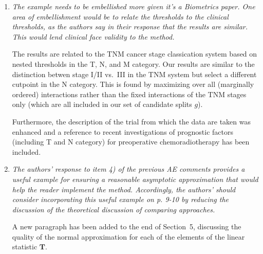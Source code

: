 \documentclass[11pt,a4paper]{article}
\begin{document}
\begin{enumerate}

  \item \textit{The example needs to be embellished more given it's a Biometrics paper. One area of
embellishment would be to relate the thresholds to the clinical thresholds, as the authors
say in their response that the results are similar. This would lend clinical face validity
to the method.}

The results are related to the TNM cancer stage classication system based on
nested thresholds in the T, N, and M category. Our results are similar to 
the distinction betwen stage I/II vs.\ III in the TNM system but select
a different cutpoint in the N category. This is found by maximizing over all
(marginally ordered) interactions rather than the fixed interactions of the
TNM stages only (which are all included in our set of candidate splits $g$).

Furthermore, the description of the trial from which the data are taken 
was enhanced and a reference to recent investigations of prognostic factors (including T and N category)
for preoperative chemoradiotherapy has been included.

\item \textit{The authors' response to item 4) of the previous AE comments provides a useful
example for ensuring a reasonable asymptotic approximation that would help the reader
implement the method. Accordingly, the authors' should consider incorporating this
useful example on p. 9-10 by reducing the discussion of the theoretical discussion of
comparing approaches.}

A new paragraph has been added to the end of Section~5, discussing the
quality of the normal approximation for each of the elements of the
linear statistic $\mathbf{T}$.

\end{enumerate}
\end{document}
